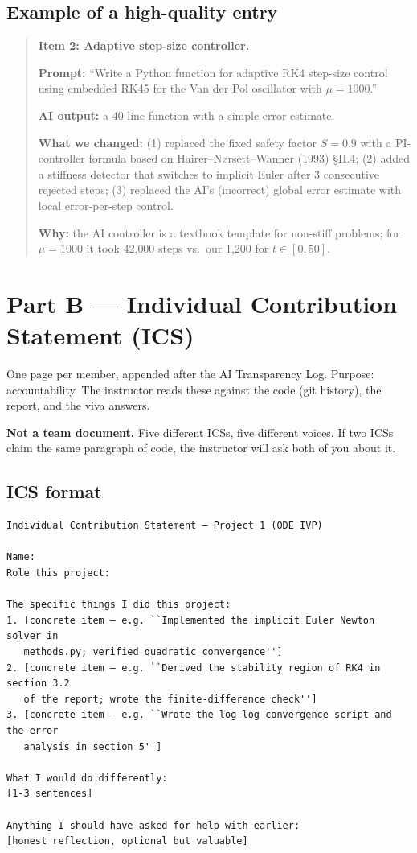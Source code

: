 \documentclass[11pt]{article}
\begin{document}
\subsection*{Example of a high-quality entry}
\begin{quote}
\textbf{Item 2: Adaptive step-size controller.}

\textbf{Prompt:} ``Write a Python function for adaptive RK4 step-size control
using embedded RK45 for the Van der Pol oscillator with $\mu = 1000$.''

\textbf{AI output:} a 40-line function with a simple error estimate.

\textbf{What we changed:} (1) replaced the fixed safety factor $S = 0.9$ with a
PI-controller formula based on Hairer--N{\o}rsett--Wanner (1993) \S II.4;
(2) added a stiffness detector that switches to implicit Euler after 3
consecutive rejected steps; (3) replaced the AI's (incorrect) global error
estimate with local error-per-step control.

\textbf{Why:} the AI controller is a textbook template for non-stiff problems;
for $\mu = 1000$ it took 42{,}000 steps vs.\ our 1{,}200 for $t \in [0, 50]$.
\end{quote}

\section*{Part B --- Individual Contribution Statement (ICS)}
One page per member, appended after the AI Transparency Log. Purpose:
accountability. The instructor reads these against the code (git history), the
report, and the viva answers.

\textbf{Not a team document.} Five different ICSs, five different voices. If two
ICSs claim the same paragraph of code, the instructor will ask both of you about it.

\subsection*{ICS format}
\begin{verbatim}
Individual Contribution Statement — Project 1 (ODE IVP)

Name:
Role this project:

The specific things I did this project:
1. [concrete item — e.g. ``Implemented the implicit Euler Newton solver in
   methods.py; verified quadratic convergence'']
2. [concrete item — e.g. ``Derived the stability region of RK4 in section 3.2
   of the report; wrote the finite-difference check'']
3. [concrete item — e.g. ``Wrote the log-log convergence script and the error
   analysis in section 5'']

What I would do differently:
[1-3 sentences]

Anything I should have asked for help with earlier:
[honest reflection, optional but valuable]
\end{verbatim}
\end{document}
